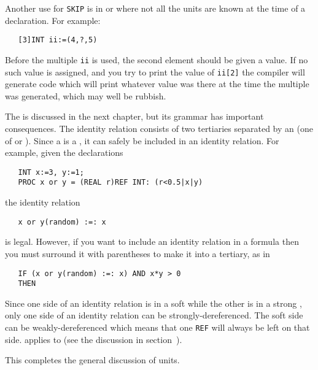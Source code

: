 Another use for \verb|SKIP| is in  or
 where not all the units
are known at the time of a declaration.  For example:
\begin{verbatim}
   [3]INT ii:=(4,?,5)
\end{verbatim}
\noindent
Before the multiple \verb|ii| is used, the second element should be
given a value. If no such value is assigned, and you try to print the
value of \verb|ii[2]| the 
compiler will generate code which will print whatever value was there
at the time the multiple was generated, which may well be rubbish.

The  is discussed in the
next chapter, but its grammar has important consequences. The
identity relation consists of two tertiaries separated by an
 (one of \ixtt{:=:} or
\ixtt{:/=:}). Since a  is a , it can safely
be included in an identity relation.  For example, given the
declarations
\begin{verbatim}
   INT x:=3, y:=1;
   PROC x or y = (REAL r)REF INT: (r<0.5|x|y)
\end{verbatim}
\noindent
the identity relation
\begin{verbatim}
   x or y(random) :=: x
\end{verbatim}
\noindent
is legal. However, if you want to include an identity relation in a
formula then you must surround it with parentheses to make it into a
tertiary, as in
\begin{verbatim}
   IF (x or y(random) :=: x) AND x*y > 0
   THEN
\end{verbatim}
\noindent
Since one side of an identity relation is in a soft
 while the other is in a strong
, only one side of an identity
relation can be strongly-dereferenced. The soft side can be
weakly-dereferenced which means that one \verb|REF| will always be
left on that side.  applies to
 (see the
discussion in section~).

This completes the general discussion of units.

